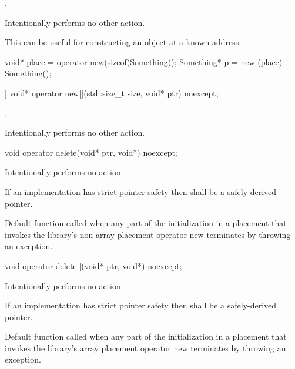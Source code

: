 \begin{itemdescr}
\pnum
\returns
{}.

\pnum
\remarks
Intentionally performs no other action.

\pnum
\begin{example}
This can be useful for constructing an object at a known address:

\begin{codeblock}
void* place = operator new(sizeof(Something));
Something* p = new (place) Something();
\end{codeblock}
\end{example}
\end{itemdescr}

%
\begin{itemdecl}
[[nodiscard]] void* operator new[](std::size_t size, void* ptr) noexcept;
\end{itemdecl}

\begin{itemdescr}
\pnum
\returns
{}.

\pnum
\remarks
Intentionally performs no other action.
\end{itemdescr}

%
\begin{itemdecl}
void operator delete(void* ptr, void*) noexcept;
\end{itemdecl}

\begin{itemdescr}
\pnum
\effects
Intentionally performs no action.

\pnum
\requires
If an implementation has strict pointer safety
then  shall be a safely-derived pointer.

\pnum
\remarks
Default function called when any part of the initialization in a
placement  that invokes the library's
non-array placement operator new
terminates by throwing an exception.
\end{itemdescr}

%
\begin{itemdecl}
void operator delete[](void* ptr, void*) noexcept;
\end{itemdecl}

\begin{itemdescr}
\pnum
\effects
Intentionally performs no action.

\pnum
\requires
If an implementation has strict pointer safety
then  shall be a safely-derived pointer.

\pnum
\remarks
Default function called when any part of the initialization in a
placement  that invokes the library's
array placement operator new
terminates by throwing an exception.
\end{itemdescr}

